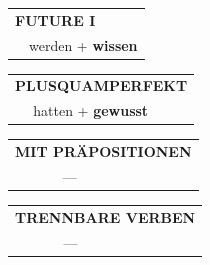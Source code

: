 \documentclass[10pt,a4paper]{revtex4-2}
\begin{document}
\begin{verbbox}
\begin{tabular}{rl}
    \multicolumn{2}{l}{\textbf{FUTURE I} }\\
  &  werden + \textbf{wissen}\\
 
  \end{tabular}
\hfill
   \begin{tabular}{rl}
      \multicolumn{2}{l}{\textbf{PLUSQUAMPERFEKT}}\\
   & hatten + \textbf{gewusst}\\
  \end{tabular}
  
  \vspace{10pt}



\begin{tabular}{lll}
\multicolumn{3}{l}{\textbf{MIT PRÄPOSITIONEN}}\\
& ---\\
\end{tabular}
\hfill
\begin{tabular}{lll}
\multicolumn{3}{l}{\textbf{TRENNBARE VERBEN}}\\
& ---\\
\end{tabular}

  \vspace{-5pt}

\end{verbbox}
\end{document}
